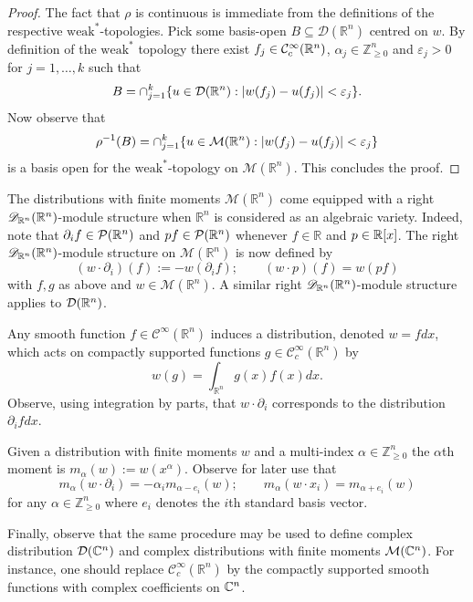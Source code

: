 \begin{proof}
   The fact that $\rho$ is continuous is immediate from the definitions of the respective $\text{weak}^*$-topologies.
   Pick some basis-open $B\subseteq \mathcal{D}(\mathbb{R}^n)$ centred on $w$.
   By definition of the $\text{weak}^*$ topology there exist $f_j\in \mathcal{C}_c^\infty(\mathbb{R}^n)$, $\alpha_j\in \mathbb{Z}^n_{\geq 0}$ and  $\varepsilon_j >0$ for $j=1,\ldots, k$ such that
   $$B = \cap_{j=1}^k \{u\in \mathcal{D}(\mathbb{R}^n): \vert w(f_j) -u(f_j) \vert <\varepsilon_j\}. $$
   Now observe that
   $$\rho^{-1}(B) = \cap_{j=1}^k \{u\in \mathcal{M}(\mathbb{R}^n): \vert w(f_j)-u(f_j) \vert <\varepsilon_j\}$$
   is a basis open for the $\text{weak}^*$-topology on $\mathcal{M}(\mathbb{R}^n)$.
   This concludes the proof.
\end{proof}

The distributions with finite moments $\mathcal{M}(\mathbb{R}^n)$ come equipped with a right $\mathscr{D}_{\mathbb{R}^n}(\mathbb{R}^n)$-module structure when $\mathbb{R}^n$ is considered as an algebraic variety.
Indeed, note that $\partial_i f\in \mathcal{P}(\mathbb{R}^n)$ and $pf\in \mathcal{P}(\mathbb{R}^n)$ whenever $f\in \mathbb{R}$ and $p\in \mathbb{R}[x]$.
The right $\mathscr{D}_{\mathbb{R}^n}(\mathbb{R}^n)$-module structure on $\mathcal{M}(\mathbb{R}^n)$ is now defined by
$$(w\cdot \partial_i)(f) := -w(\partial_i f); \qquad (w\cdot p)(f) = w(pf)$$
with $f,g$ as above and $w\in \mathcal{M}(\mathbb{R}^n)$.
A similar right $\mathscr{D}_{\mathbb{R}^n}(\mathbb{R}^n)$-module structure applies to $\mathcal{D}(\mathbb{R}^n)$.
\begin{remark}
  Any smooth function $f\in \mathcal{C}^\infty(\mathbb{R}^n)$ induces a distribution, denoted $w = fdx$, which acts on compactly supported functions $g\in \mathcal{C}_c^\infty(\mathbb{R}^n)$ by
  $$w(g) =\int_{\mathbb{R}^n} g(x)f(x) dx.$$
  Observe, using integration by parts, that $w\cdot \partial_i$ corresponds to the distribution $\partial_i f dx$.
\end{remark}

Given a distribution with finite moments $w$ and a multi-index $\alpha\in \mathbb{Z}_{\geq 0}^n$ the $\alpha$th moment is $m_{\alpha}(w):= w(x^\alpha)$.
Observe for later use that
$$ m_{\alpha}(w\cdot \partial_i) = -\alpha_i m_{\alpha -e_i}(w); \qquad m_{\alpha}(w\cdot x_i) = m_{\alpha + e_i}(w)$$
for any $\alpha \in \mathbb{Z}_{\geq 0}^{n}$ where $e_i$ denotes the $i$th standard basis vector.

Finally, observe that the same procedure may be used to define complex distribution $\mathcal{D}(\mathbb{C}^n)$ and complex distributions with finite moments $\mathcal{M}(\mathbb{C}^n)$.
For instance, one should replace $\mathcal{C}_c^\infty(\mathbb{R}^n)$ by the compactly supported smooth functions with complex coefficients on $\mathbb{C}^n$.

